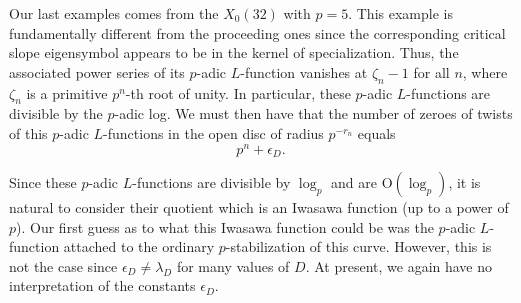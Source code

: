 \documentclass{amsart}
\theoremstyle{plain}
\theoremstyle{definition}
\newcommand{\OO}{\text{O}}
\begin{document}
Our last examples comes from the $X_0(32)$ with $p=5$.  This example is fundamentally different from the proceeding ones since the corresponding critical slope eigensymbol appears to be in the kernel of specialization.  Thus, the associated power series of its $p$-adic $L$-function vanishes at $\zeta_n-1$ for all $n$, where $\zeta_n$ is a primitive $p^n$-th root of unity.  In particular, these $p$-adic $L$-functions are divisible by the $p$-adic log.  We must then have that the number of zeroes of twists of this $p$-adic $L$-functions in the open disc of radius $p^{-r_n}$ equals
$$
p^n + \epsilon_D.
$$

Since these $p$-adic $L$-functions are divisible by $\log_p$ and are $\OO(\log_p)$, it is natural to consider their quotient which is an Iwasawa function (up to a power of $p$).  Our first guess as to what this Iwasawa function could be was the $p$-adic $L$-function attached to the ordinary $p$-stabilization of this curve.  However, this is not the case since $\epsilon_D \neq \lambda_D$ for many values of $D$.  At present, we again have no interpretation of the constants $\epsilon_D$.
\end{document}
